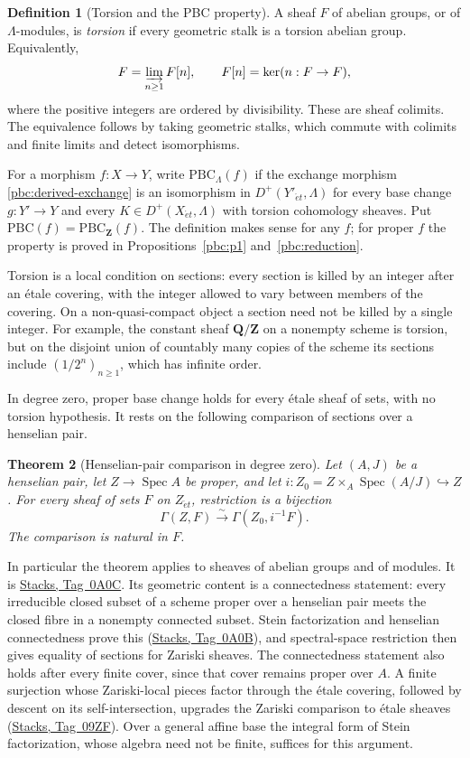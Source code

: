 \documentclass[11pt,a4paper]{article}
\numberwithin{equation}{section}
\newtheorem{theorem}{Theorem}[section]
\theoremstyle{definition}
\newtheorem{definition}[theorem]{Definition}
\theoremstyle{remark}
\newcommand{\D}{D}
\newcommand{\et}{\acute{e}t}
\newcommand{\stacks}[1]{\href{https://stacks.math.columbia.edu/tag/#1}{\textnormal{Stacks, Tag~#1}}}
\newcommand{\Z}{\mathbf Z}
\newcommand{\Q}{\mathbf Q}
\begin{document}
\begin{definition}[Torsion and the PBC property]\label{pbc:property}
A sheaf $F$ of abelian groups, or of $\Lambda$-modules, is
\emph{torsion} if every geometric stalk is a torsion abelian group.
Equivalently,
\[
 F=\varinjlim_{n\geq1}F[n],\qquad F[n]=\ker(n:F\to F),
\]
where the positive integers are ordered by divisibility. These are
sheaf colimits. The equivalence follows by taking geometric stalks,
which commute with colimits and finite limits and detect isomorphisms.

For a morphism $f:X\to Y$, write $\mathrm{PBC}_{\Lambda}(f)$ if the exchange morphism
\eqref{pbc:derived-exchange} is an isomorphism in $\D^+(Y'_{\et},\Lambda)$
for every base change
$g:Y'\to Y$ and every $K\in\D^+(X_{\et},\Lambda)$ with torsion
cohomology sheaves. Put $\mathrm{PBC}(f)=\mathrm{PBC}_{\Z}(f)$.
The definition makes sense for any $f$; for proper $f$ the property is
proved in Propositions~\ref{pbc:p1} and~\ref{pbc:reduction}.
\end{definition}

Torsion is a local condition on sections: every section is killed by an
integer after an \'etale covering, with the integer allowed to vary
between members of the covering. On a non-quasi-compact object a
section need not be killed by a single integer. For example, the
constant sheaf $\Q/\Z$ on a nonempty scheme is torsion, but on the
disjoint union of countably many copies of the scheme its sections
include $(1/2^n)_{n\geq1}$, which has infinite order.

In degree zero, proper base change holds for every \'etale sheaf of
sets, with no torsion hypothesis. It rests on the following comparison
of sections over a henselian pair.

\begin{theorem}[Henselian-pair comparison in degree zero]
\label{pbc:henselian-h0}
Let $(A,J)$ be a henselian pair, let $Z\to\operatorname{Spec}A$ be
proper, and let $i:Z_0=Z\times_A\operatorname{Spec}(A/J)\hookrightarrow Z$.
For every sheaf of sets $F$ on $Z_{\et}$, restriction is a bijection
\[
 \Gamma(Z,F)\xrightarrow{\sim}\Gamma(Z_0,i^{-1}F).
\]
The comparison is natural in $F$.
\end{theorem}

In particular the theorem applies to sheaves of abelian groups and of
modules. It is \stacks{0A0C}. Its geometric content is a connectedness
statement: every irreducible closed subset of a scheme proper over a
henselian pair meets the closed fibre in a nonempty connected subset.
Stein factorization and henselian connectedness prove this
(\stacks{0A0B}), and spectral-space restriction then gives equality of
sections for Zariski sheaves. The connectedness statement also holds
after every finite cover, since that cover remains proper over $A$.
A finite surjection whose Zariski-local pieces factor through the
\'etale covering, followed by descent on its self-intersection,
upgrades the Zariski comparison to \'etale sheaves (\stacks{09ZF}).
Over a general affine base the integral form of Stein factorization,
whose algebra need not be finite, suffices for this argument.
\end{document}
